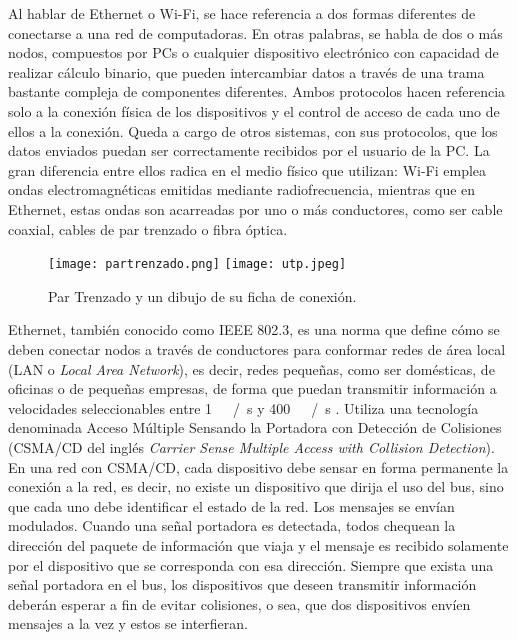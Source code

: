 Al hablar de Ethernet o Wi-Fi, se hace referencia a dos formas diferentes de conectarse a una red de computadoras. En otras palabras, se habla de dos o más nodos, compuestos por PCs o cualquier dispositivo electrónico con capacidad de realizar cálculo binario, que pueden intercambiar datos a través de una trama bastante compleja de componentes diferentes. Ambos protocolos hacen referencia solo a la conexión física de los dispositivos y el control de acceso de cada uno de ellos a la conexión. Queda a cargo de otros sistemas, con sus protocolos, que los datos enviados puedan ser correctamente recibidos por el usuario de la PC. La gran diferencia entre ellos radica en el medio físico que utilizan: Wi-Fi emplea ondas electromagnéticas emitidas mediante radiofrecuencia, mientras que en Ethernet, estas ondas son acarreadas por uno o más conductores, como ser cable coaxial, cables de par trenzado o fibra óptica.%

\begin{figure}
	\centering
	\texttt{[image: partrenzado.png]}
	\texttt{[image: utp.jpeg]}
	\caption{Par Trenzado y un dibujo de su ficha de conexión.}
	\label{fig:utp}
\end{figure}

Ethernet, también conocido como IEEE 802.3, es una norma que define cómo se deben conectar nodos a través de conductores para conformar redes de área local (LAN o {\it Local Area Network}), es decir, redes pequeñas, como ser domésticas, de oficinas o de pequeñas empresas, de forma que puedan transmitir información a velocidades seleccionables entre \SI{1}{\mega\bit\slash\second} y \SI{400}{\giga\bit\slash\second} \cite{Ethernet2018}. Utiliza una tecnología denominada Acceso Múltiple Sensando la Portadora con Detección de Colisiones (CSMA/CD del inglés {\it Carrier Sense Multiple Access with Collision Detection}). En una red con CSMA/CD, cada dispositivo debe sensar en forma permanente la conexión a la red, es decir, no existe un dispositivo que dirija el uso del bus, sino que cada uno debe identificar el estado de la red. Los mensajes se envían modulados. Cuando una señal portadora es detectada, todos chequean la dirección del paquete de información que viaja y el mensaje es recibido solamente por el dispositivo que se corresponda con esa dirección. Siempre que exista una señal portadora en el bus, los dispositivos que deseen transmitir información deberán esperar a fin de evitar colisiones, o sea, que dos dispositivos envíen mensajes a la vez y estos se interfieran.%

